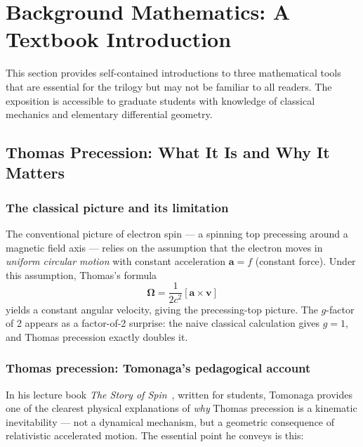 \documentclass[12pt,letterpaper]{article}
\begin{document}
\clearpage

\section{Background Mathematics: A Textbook Introduction}
\label{sec:background}

This section provides self-contained introductions to three mathematical tools
that are essential for the trilogy but may not be familiar to all readers.
The exposition is accessible to graduate students with knowledge of classical mechanics
and elementary differential geometry.

\subsection{Thomas Precession: What It Is and Why It Matters}
\label{subsec:thomas}

\subsubsection{The classical picture and its limitation}

The conventional picture of electron spin --- a spinning top precessing around a magnetic
field axis --- relies on the assumption that the electron moves in \emph{uniform circular
motion} with constant acceleration $\mathbf{a} = f$ (constant force).
Under this assumption, Thomas's formula
\begin{equation}
\boldsymbol{\Omega} = \frac{1}{2c^2}[\mathbf{a}\times\mathbf{v}]
\label{eq:thomas_general}
\end{equation}
yields a constant angular velocity, giving the precessing-top picture.
The $g$-factor of 2 appears as a factor-of-2 surprise: the naive classical calculation
gives $g=1$, and Thomas precession exactly doubles it.

\subsubsection{Thomas precession: Tomonaga's pedagogical account}

In his lecture book \textit{The Story of Spin}~\cite{Tomonaga1997}, written
for students, Tomonaga provides one of the clearest physical explanations of
\emph{why} Thomas precession is a kinematic inevitability --- not a dynamical
mechanism, but a geometric consequence of relativistic accelerated motion.
The essential point he conveys is this:
\end{document}

